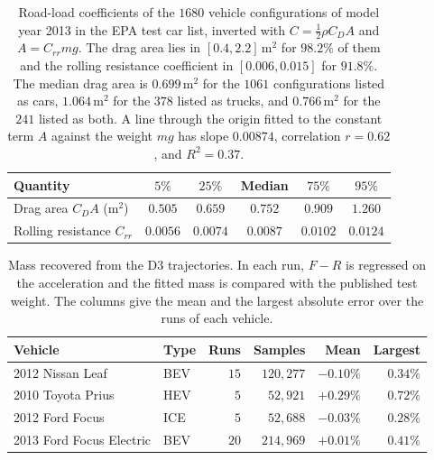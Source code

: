 \documentclass[12pt, twoside]{amsart}
\theoremstyle{definition}
\begin{document}
\begin{table}[htbp]
\centering\small
\caption{Road-load coefficients of the $1680$ vehicle configurations of model year 2013 in the EPA test car list, inverted with $C=\tfrac12\rho C_DA$ and $A=C_{rr}mg$. The drag area lies in $[0.4,2.2]$\,m$^2$ for $98.2\%$ of them and the rolling resistance coefficient in $[0.006,0.015]$ for $91.8\%$. The median drag area is $0.699$\,m$^2$ for the $1061$ configurations listed as cars, $1.064$\,m$^2$ for the $378$ listed as trucks, and $0.766$\,m$^2$ for the $241$ listed as both. A line through the origin fitted to the constant term $A$ against the weight $mg$ has slope $0.00874$, correlation $r=0.62$, and $R^2=0.37$.}\label{tab:app-epa}
\begin{tabular}{lccccc}
\toprule
Quantity & $5\%$ & $25\%$ & Median & $75\%$ & $95\%$\\
\midrule
Drag area $C_DA$ (m$^2$) & $0.505$ & $0.659$ & $0.752$ & $0.909$ & $1.260$\\
Rolling resistance $C_{rr}$ & $0.0056$ & $0.0074$ & $0.0087$ & $0.0102$ & $0.0124$\\
\bottomrule
\end{tabular}
\end{table}
\begin{table}[htbp]
\centering\small
\caption{Mass recovered from the D3 trajectories. In each run, $F-R$ is regressed on the acceleration and the fitted mass is compared with the published test weight. The columns give the mean and the largest absolute error over the runs of each vehicle.}\label{tab:app-d3mass}
\begin{tabular}{llrrrr}
\toprule
Vehicle & Type & Runs & Samples & Mean & Largest\\
\midrule
2012 Nissan Leaf & BEV & $15$ & $120{,}277$ & $-0.10\%$ & $0.34\%$\\
2010 Toyota Prius & HEV & $5$ & $52{,}921$ & $+0.29\%$ & $0.72\%$\\
2012 Ford Focus & ICE & $5$ & $52{,}688$ & $-0.03\%$ & $0.28\%$\\
2013 Ford Focus Electric & BEV & $20$ & $214{,}969$ & $+0.01\%$ & $0.41\%$\\
\bottomrule
\end{tabular}
\end{table}
\end{document}
